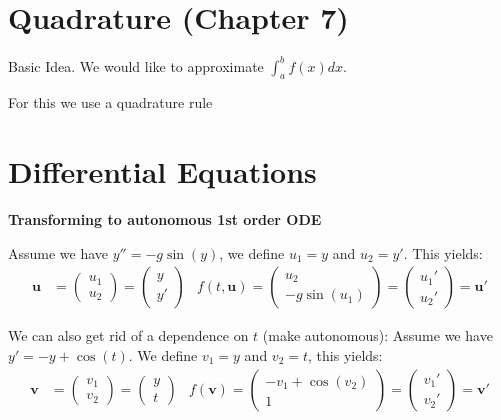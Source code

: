 \documentclass{sciposter}
\newcommand{\TODO}[1]{\todo[inline, color=red!40]{#1}}
\renewcommand{\vec}[1]{\mathbf{#1}}
\newcommand{\psection}[1]{\par \textbf{\large#1}}
\begin{document}
\begin{multicols}{2}
\begin{itemize}
\end{itemize}




\section*{Quadrature (Chapter 7)}


Basic Idea. We would like to approximate $\int_{a}^{b} f(x) dx$. 

For this we use a quadrature rule \TODO{add stuff}


\section*{Differential Equations}

\psection{Transforming to autonomous 1st order ODE}

Assume we have $y'' = -g\sin(y)$, we define $u_1 = y$ and $u_2 = y'$. This yields:
\begin{align*}
	\vec{u} &= \begin{pmatrix}
	u_1 \\ u_2
	\end{pmatrix} = \begin{pmatrix}
	y \\ y'
	\end{pmatrix} & f(t,\vec{u}) = \begin{pmatrix}
	u_2 \\ -g\sin(u_1)
	\end{pmatrix} = \begin{pmatrix}
	u_1 '\\ u_2 '
	\end{pmatrix} = \vec{u}'
\end{align*}


We can also get rid of a dependence on $t$ (make autonomous): Assume we have $y' = -y + \cos(t)$. We define $v_1 = y$ and $v_2 = t$, this yields:
\begin{align*}
	\vec{v} &= \begin{pmatrix}
		v_1 \\ v_2
	\end{pmatrix} = \begin{pmatrix}
		y \\ t
	\end{pmatrix} & f(\vec{v}) = \begin{pmatrix}
		-v_1 + \cos(v_2) \\ 1
	\end{pmatrix} = \begin{pmatrix}
		v_1 '\\ v_2 '
	\end{pmatrix} = \vec{v}'
\end{align*}




\end{multicols}
\end{document}
